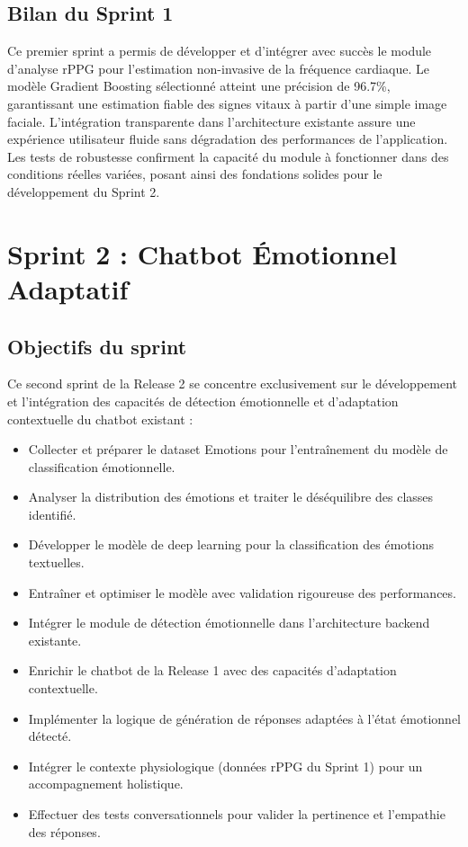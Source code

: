 \subsection{Bilan du Sprint 1}
Ce premier sprint a permis de développer et d'intégrer avec succès le module d'analyse rPPG pour l'estimation non-invasive de la fréquence cardiaque. Le modèle Gradient Boosting sélectionné atteint une précision de 96.7\%, garantissant une estimation fiable des signes vitaux à partir d'une simple image faciale. L'intégration transparente dans l'architecture existante assure une expérience utilisateur fluide sans dégradation des performances de l'application. Les tests de robustesse confirment la capacité du module à fonctionner dans des conditions réelles variées, posant ainsi des fondations solides pour le développement du Sprint 2.

\section{Sprint 2 : Chatbot Émotionnel Adaptatif}

\subsection{Objectifs du sprint}
Ce second sprint de la Release 2 se concentre exclusivement sur le développement et l'intégration des capacités de détection émotionnelle et d'adaptation contextuelle du chatbot existant :
\begin{itemize}
    \item Collecter et préparer le dataset Emotions pour l'entraînement du modèle de classification émotionnelle.
    \item Analyser la distribution des émotions et traiter le déséquilibre des classes identifié.
    \item Développer le modèle de deep learning pour la classification des émotions textuelles.
    \item Entraîner et optimiser le modèle avec validation rigoureuse des performances.
    \item Intégrer le module de détection émotionnelle dans l'architecture backend existante.
    \item Enrichir le chatbot de la Release 1 avec des capacités d'adaptation contextuelle.
    \item Implémenter la logique de génération de réponses adaptées à l'état émotionnel détecté.
    \item Intégrer le contexte physiologique (données rPPG du Sprint 1) pour un accompagnement holistique.
    \item Effectuer des tests conversationnels pour valider la pertinence et l'empathie des réponses.
\end{itemize}

